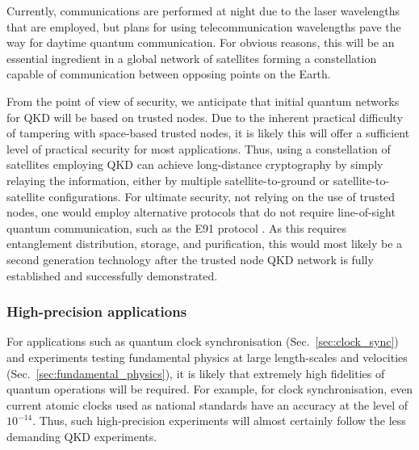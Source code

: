Currently, communications are performed at night due to the laser wavelengths that are employed, but plans for using telecommunication wavelengths pave the way for daytime quantum communication. For obvious reasons, this will be an essential ingredient in a global network of satellites forming a constellation capable of communication between opposing points on the Earth.

From the point of view of security, we anticipate that initial quantum networks for QKD will be based on trusted nodes. Due to the inherent practical difficulty of tampering with space-based trusted nodes, it is likely this will offer a sufficient level of practical security for most applications. Thus, using a constellation of satellites employing QKD can achieve long-distance cryptography by simply relaying the information, either by multiple satellite-to-ground or satellite-to-satellite configurations. For ultimate security, not relying on the use of trusted nodes, one would employ alternative protocols that do not require line-of-sight quantum communication, such as the E91 protocol \cite{bib:ekert1991quantum}. As this requires entanglement distribution, storage, and purification, this would most likely be a second generation technology after the trusted node QKD network is fully established and successfully demonstrated. 

%
%

\subsubsection{High-precision applications}

For applications such as quantum clock synchronisation (Sec.~\ref{sec:clock_sync}) and experiments testing fundamental physics at large length-scales and velocities (Sec.~\ref{sec:fundamental_physics}), it is likely that extremely high fidelities of quantum operations will be required. For example, for clock synchronisation, even current atomic clocks used as national standards have an accuracy at the level of $10^{-14}$. Thus, such high-precision experiments will almost certainly follow the less demanding QKD experiments.

